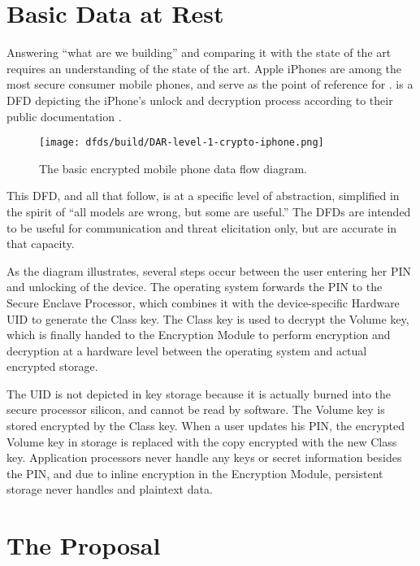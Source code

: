 \section{Basic Data at Rest}

Answering ``what are we building'' and comparing it with the state of the art requires an understanding of the state of
the art. Apple iPhones are among the most secure consumer mobile phones, and serve as the point of reference for
\ldawmsR.  is a \ac{DFD} depicting the iPhone's unlock and decryption process according to their
public documentation \cite{apple_2020}.

\begin{figure}[h]
    \centering\CaptionFontSize
    \texttt{[image: dfds/build/DAR-level-1-crypto-iphone.png]}
    \caption{The basic encrypted mobile phone data flow diagram.}
    \label{fig-dfd-iphone}
\end{figure}

This \ac{DFD}, and all that follow, is at a specific level of abstraction, simplified in the spirit of ``all models are
wrong, but some are useful.'' The \acp{DFD} are intended to be useful for communication and threat elicitation only, but
are accurate in that capacity.

As the diagram illustrates, several steps occur between the user entering her \ac{PIN} and unlocking of the device. The
operating system forwards the \ac{PIN} to the Secure Enclave Processor, which combines it with the device-specific
Hardware \ac{UID} to generate the Class key. The Class key is used to decrypt the Volume key, which is finally handed to
the Encryption Module to perform encryption and decryption at a hardware level between the operating system and actual
encrypted storage.

The \ac{UID} is not depicted in key storage because it is actually burned into the secure processor silicon, and cannot
be read by software. The Volume key is stored encrypted by the Class key. When a user updates his \ac{PIN}, the
encrypted Volume key in storage is replaced with the copy encrypted with the new Class key. Application processors never
handle any keys or secret information besides the \ac{PIN}, and due to inline encryption in the Encryption Module,
persistent storage never handles and \ac{plaintext} data.


\section{The \ldawmsr Proposal}


